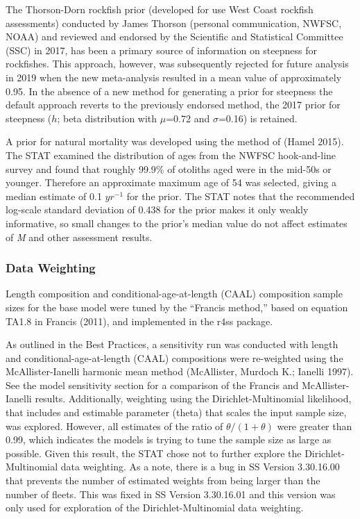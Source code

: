 \documentclass[
  english,
  a4paper,
]{article}
\begin{document}
The Thorson-Dorn rockfish prior (developed for use West Coast rockfish assessments) conducted by James Thorson (personal communication, NWFSC, NOAA) and reviewed and endorsed by the Scientific and Statistical Committee (SSC) in 2017, has been a primary source of information on steepness for rockfishes. This approach, however, was subsequently rejected for future analysis in 2019 when the new meta-analysis resulted in a mean value of approximately 0.95. In the absence of a new method for generating a prior for steepness the default approach reverts to the previously endorsed method, the 2017 prior for steepness (\(h\); beta distribution with \(\mu\)=0.72 and \(\sigma\)=0.16) is retained.

A prior for natural mortality was developed using the method of (Hamel 2015). The STAT examined the distribution of ages from the NWFSC hook-and-line survey and found that roughly 99.9\% of otoliths aged were in the mid-50s or younger. Therefore an approximate maximum age of 54 was selected, giving a median estimate of 0.1 \(yr^{-1}\) for the prior. The STAT notes that the recommended log-scale standard deviation of 0.438 for the prior makes it only weakly informative, so small changes to the prior's median value do not affect estimates of \emph{M} and other assessment results.

\hypertarget{data-weighting}{%
\subsubsection{Data Weighting}\label{data-weighting}}

Length composition and conditional-age-at-length (CAAL) composition sample sizes for
the base model were tuned by the ``Francis method,'' based on equation TA1.8 in Francis
(2011), and implemented in the r4ss package.

As outlined in the Best Practices, a sensitivity run was conducted with length and
conditional-age-at-length (CAAL) compositions were re-weighted using the
McAllister-Ianelli harmonic mean method (McAllister, Murdoch K.; Ianelli 1997). See the model sensitivity section for a comparison of the Francis and McAllister-Ianelli results. Additionally, weighting
using the Dirichlet-Multinomial likelihood, that includes and estimable parameter (theta)
that scales the input sample size, was explored. However, all estimates of the ratio of
\(\theta/(1+\theta)\) were greater than 0.99, which indicates the models is trying to tune
the sample size as large as possible. Given this result, the STAT chose not to further explore
the Dirichlet-Multinomial data weighting. As a note, there is a bug in SS Version 3.30.16.00 that
prevents the number of estimated weights from being larger than the number of fleets. This was
fixed in SS Version 3.30.16.01 and this version was only used for exploration of the Dirichlet-Multinomial data weighting.
\end{document}
